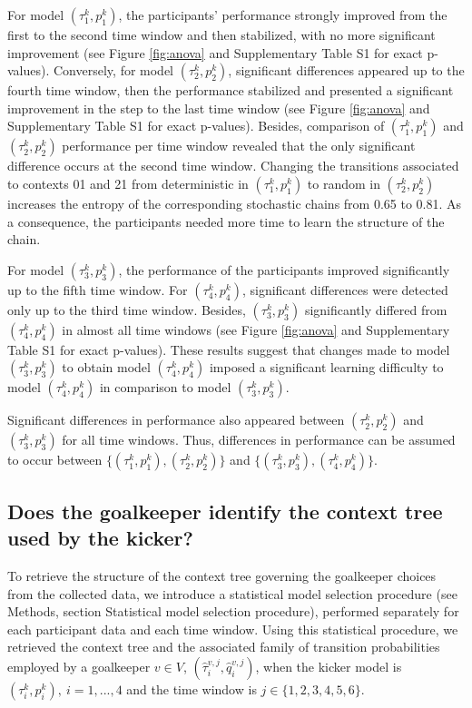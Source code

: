 \documentclass[fleqn,10pt]{wlscirep}
\begin{document}
For model $(\tau^k_1, p^k_1)$, the participants' performance strongly improved from the first to the second time window and then stabilized, with no more significant improvement (see Figure \ref{fig:anova} and Supplementary Table S1 for exact p-values). Conversely, for model $(\tau^k_2, p^k_2)$, significant differences appeared up to the fourth time window, then the performance stabilized and presented a significant improvement in the step to the last time window (see Figure \ref{fig:anova} and Supplementary Table S1 for exact p-values). Besides, comparison of $(\tau^k_1, p^k_1)$ and $(\tau^k_2, p^k_2)$ performance per time window revealed that the only significant difference occurs at the second time window. Changing the transitions associated to contexts 01 and 21 from deterministic in $(\tau^k_1, p^k_1)$ to random in $(\tau^k_2, p^k_2)$  increases the entropy of the corresponding stochastic chains from 0.65 to 0.81. As a consequence, the participants needed more time to learn the structure of the chain.

For model $(\tau^k_3, p^k_3)$, the performance of the participants improved significantly up to the fifth time window. For $(\tau^k_4, p^k_4)$, significant differences were detected only up to the third time window. Besides, $(\tau^k_3, p^k_3)$ significantly differed from $(\tau^k_4, p^k_4)$ in almost all time windows (see Figure \ref{fig:anova} and Supplementary Table S1 for exact p-values). These results suggest that changes made to model $(\tau^k_3, p^k_3)$ to obtain model $(\tau^k_4, p^k_4)$ imposed a significant learning difficulty to model $(\tau^k_4, p^k_4)$ in comparison to model $(\tau^k_3, p^k_3)$. 

Significant differences in performance also appeared between $(\tau^k_2, p^k_2)$ and $(\tau^k_3, p^k_3)$ for all time windows. Thus, differences in performance can be assumed to occur between $\{(\tau^k_1, p^k_1), (\tau^k_2, p^k_2)\}$ and $\{(\tau^k_3, p^k_3), (\tau^k_4, p^k_4)\}$.

\subsection*{Does the goalkeeper identify the context tree used by the kicker?}

To retrieve the structure of the context tree governing the goalkeeper choices from the collected data, we introduce a statistical model selection procedure (see Methods, section Statistical model selection procedure), performed separately for each participant data and each time window. Using this statistical procedure, we retrieved the context tree and the associated family of transition probabilities employed by a goalkeeper $v \in V$,  $(\hat{\tau}^{v,j}_i, \hat{q}^{v,j}_i)$, when the kicker model is $(\tau^k_i, p^k_i), \ i = 1,...,4$ and the time window is $j \in \{1,2,3,4,5,6\}$.
\end{document}
